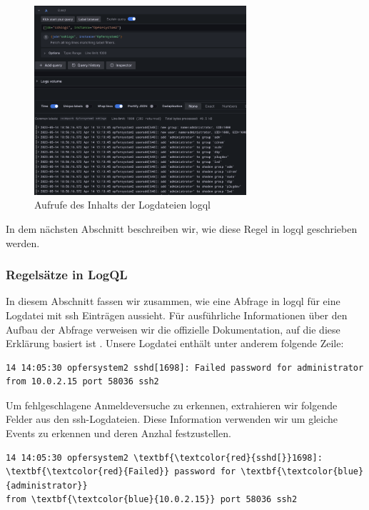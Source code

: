 \begin{figure}[H]
   \centering
   \includegraphics[width=0.7\textwidth]{assets/Logql_labels.png}
   \caption[Aufrufe des Inhalts der Logdateien mit \gls{logql}]
   {Aufrufe des Inhalts der Logdateien \gls{logql}}
   \label{fig:screenshot_logql}
   \centering
\end{figure}

In dem nächsten Abschnitt beschreiben wir, wie diese Regel in \gls{logql} geschrieben werden.

\newpage
\subsubsection{Regelsätze in LogQL}
In diesem Abschnitt fassen wir zusammen, wie eine Abfrage in \gls{logql} für eine Logdatei mit \gls{ssh} Einträgen aussieht. Für ausführliche Informationen über den Aufbau der Abfrage verweisen wir die offizielle Dokumentation, auf die diese Erklärung basiert ist \citep{Grafana_logql}. Unsere Logdatei enthält unter anderem folgende Zeile:

{
\begin{Verbatim}[frame=single]
14 14:05:30 opfersystem2 sshd[1698]: Failed password for administrator 
from 10.0.2.15 port 58036 ssh2
\end{Verbatim}
}

Um fehlgeschlagene Anmeldeversuche zu erkennen, extrahieren wir folgende Felder aus den \gls{ssh}-Logdateien. Diese Information verwenden wir um gleiche Events zu erkennen und deren Anzhal festzustellen. 

{
\begin{Verbatim}[commandchars=\\\{\},frame=single]
14 14:05:30 opfersystem2 \textbf{\textcolor{red}{sshd[}}1698]: \textbf{\textcolor{red}{Failed}} password for \textbf{\textcolor{blue}{administrator}}
from \textbf{\textcolor{blue}{10.0.2.15}} port 58036 ssh2
\end{Verbatim}
}

